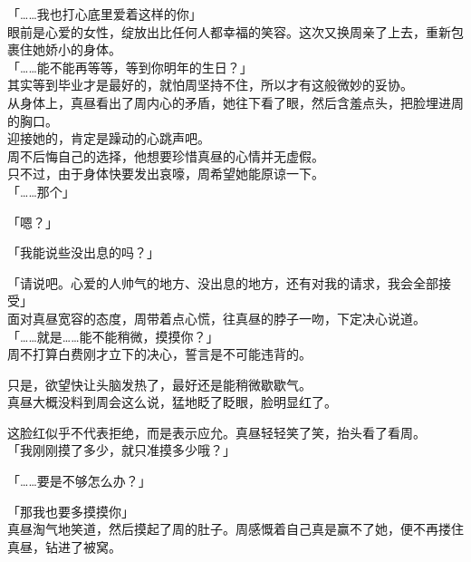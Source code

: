 「……我也打心底里爱着这样的你」\\

眼前是心爱的女性，绽放出比任何人都幸福的笑容。这次又换周亲了上去，重新包裹住她娇小的身体。\\

「……能不能再等等，等到你明年的生日？」\\

其实等到毕业才是最好的，就怕周坚持不住，所以才有这般微妙的妥协。\\

从身体上，真昼看出了周内心的矛盾，她往下看了眼，然后含羞点头，把脸埋进周的胸口。\\

迎接她的，肯定是躁动的心跳声吧。\\

周不后悔自己的选择，他想要珍惜真昼的心情并无虚假。\\

只不过，由于身体快要发出哀嚎，周希望她能原谅一下。\\

「……那个」

「嗯？」

「我能说些没出息的吗？」

「请说吧。心爱的人帅气的地方、没出息的地方，还有对我的请求，我会全部接受」\\

面对真昼宽容的态度，周带着点心慌，往真昼的脖子一吻，下定决心说道。\\

「……就是……能不能稍微，摸摸你？」\\

周不打算白费刚才立下的决心，誓言是不可能违背的。

只是，欲望快让头脑发热了，最好还是能稍微歇歇气。\\

真昼大概没料到周会这么说，猛地眨了眨眼，脸明显红了。

这脸红似乎不代表拒绝，而是表示应允。真昼轻轻笑了笑，抬头看了看周。\\

「我刚刚摸了多少，就只准摸多少哦？」

「……要是不够怎么办？」

「那我也要多摸摸你」\\

真昼淘气地笑道，然后摸起了周的肚子。周感慨着自己真是赢不了她，便不再搂住真昼，钻进了被窝。
